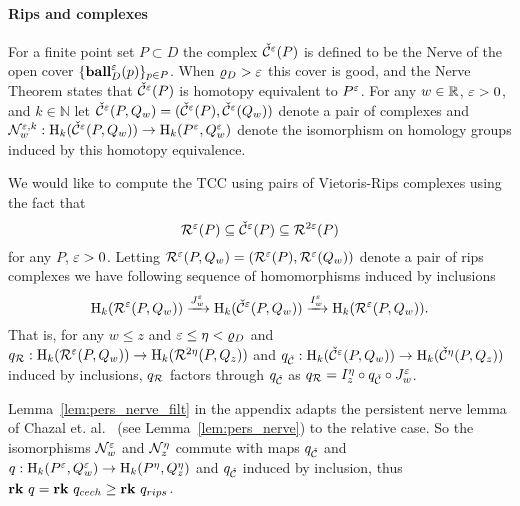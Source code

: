
\paragraph{Rips and \Cech complexes}

For a finite point set $P\subset D$ the \Cech complex $\check{\mathcal{C}}^\varepsilon(P)$ is defined to be the Nerve of the open cover $\{\mathbf{ball}_D^\varepsilon(p)\}_{p\in P}$.
When $\varrho_D > \varepsilon$ this cover is good, and the Nerve Theorem states that $\check{\mathcal{C}}^\varepsilon(P)$ is homotopy equivalent to $P^\varepsilon$.
For any $w\in\mathbb{R}$, $\varepsilon > 0$, and $k\in\mathbb{N}$ let $\check{\mathcal{C}}^\varepsilon(P,Q_w) = (\check{\mathcal{C}}^\varepsilon(P), \check{\mathcal{C}}^\varepsilon(Q_w))$ denote a pair of \Cech complexes and $\mathcal{N}_w^{\varepsilon, k} : \mathrm{H}_k(\check{\mathcal{C}}^\varepsilon(P,Q_w))\to \mathrm{H}_k(P^\varepsilon, Q_w^\varepsilon)$ denote the isomorphism on homology groups induced by this homotopy equivalence.

We would like to compute the TCC using pairs of Vietoris-Rips complexes using the fact that
\[ \mathcal{R}^\varepsilon(P)\subseteq \check{\mathcal{C}}^\varepsilon(P)\subseteq \mathcal{R}^{2\varepsilon}(P)\]
for any $P$, $\varepsilon >0$.
Letting $\mathcal{R}^\varepsilon(P,Q_w) = (\mathcal{R}^\varepsilon(P),\mathcal{R}^\varepsilon(Q_w))$ denote a pair of rips complexes we have following sequence of homomorphisms induced by inclusions
\[ \mathrm{H}_k(\mathcal{R}^\varepsilon(P, Q_w))\xrightarrow{J_w^\varepsilon}\mathrm{H}_k(\check{\mathcal{C}}^\varepsilon(P, Q_w))\xrightarrow{I_w^\varepsilon}\mathrm{H}_k(\mathcal{R}^\varepsilon(P, Q_w)).\]
That is, for any $w\leq z$ and $\varepsilon\leq\eta < \varrho_D$ and $q_{\mathcal{R}} : \mathrm{H}_k(\mathcal{R}^\varepsilon(P, Q_w))\to \mathrm{H}_k(\mathcal{R}^{2\eta}(P, Q_z))$ and $q_{\check{\mathcal{C}}} : \mathrm{H}_k(\check{\mathcal{C}}^\varepsilon(P, Q_w))\to \mathrm{H}_k(\check{\mathcal{C}}^{\eta}(P, Q_z))$ induced by inclusions, $q_{\mathcal{R}}$ factors through $q_{\check{\mathcal{C}}}$ as $q_{\mathcal{R}} = I_z^\eta\circ q_{\check{\mathcal{C}}}\circ J_w^\varepsilon$.

Lemma~\ref{lem:pers_nerve_filt} in the appendix adapts the persistent nerve lemma of Chazal et. al.~\cite{chazal08towards} (see Lemma~\ref{lem:pers_nerve}) to the relative case.
So the isomorphisms $\mathcal{N}_w^\varepsilon$ and $\mathcal{N}_z^\eta$ commute with maps $q_{\check{\mathcal{C}}}$ and $q : \mathrm{H}_k(P^\varepsilon, Q_w^\varepsilon)\to\mathrm{H}_k(P^\eta, Q_z^\eta)$ and $q_{\check{\mathcal{C}}}$ induced by inclusion, thus $\mathbf{rk}~q = \mathbf{rk}~q_{cech} \geq \mathbf{rk}~q_{rips}$.%

